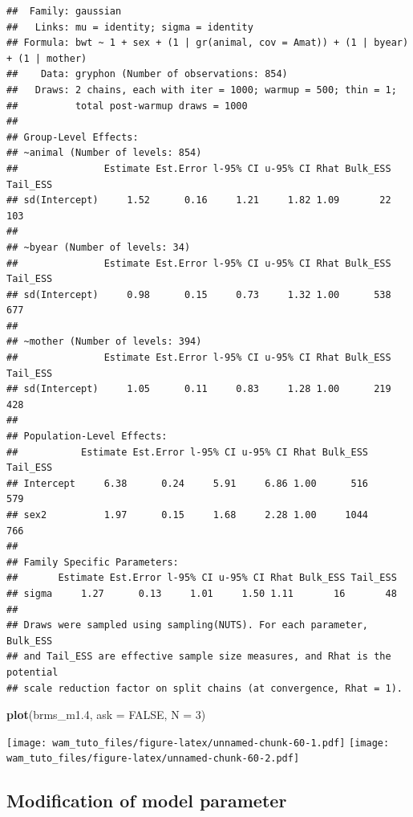 \documentclass[
  12pt,
]{book}
\newenvironment{Shaded}{\begin{snugshade}}{\end{snugshade}}
\newcommand{\DataTypeTok}[1]{\textcolor[rgb]{0.13,0.29,0.53}{#1}}
\newcommand{\DecValTok}[1]{\textcolor[rgb]{0.00,0.00,0.81}{#1}}
\newcommand{\FloatTok}[1]{\textcolor[rgb]{0.00,0.00,0.81}{#1}}
\newcommand{\KeywordTok}[1]{\textcolor[rgb]{0.13,0.29,0.53}{\textbf{#1}}}
\newcommand{\NormalTok}[1]{#1}
\newcommand{\OtherTok}[1]{\textcolor[rgb]{0.56,0.35,0.01}{#1}}
\begin{document}
\begin{verbatim}
##  Family: gaussian 
##   Links: mu = identity; sigma = identity 
## Formula: bwt ~ 1 + sex + (1 | gr(animal, cov = Amat)) + (1 | byear) + (1 | mother) 
##    Data: gryphon (Number of observations: 854) 
##   Draws: 2 chains, each with iter = 1000; warmup = 500; thin = 1;
##          total post-warmup draws = 1000
## 
## Group-Level Effects: 
## ~animal (Number of levels: 854) 
##               Estimate Est.Error l-95% CI u-95% CI Rhat Bulk_ESS Tail_ESS
## sd(Intercept)     1.52      0.16     1.21     1.82 1.09       22      103
## 
## ~byear (Number of levels: 34) 
##               Estimate Est.Error l-95% CI u-95% CI Rhat Bulk_ESS Tail_ESS
## sd(Intercept)     0.98      0.15     0.73     1.32 1.00      538      677
## 
## ~mother (Number of levels: 394) 
##               Estimate Est.Error l-95% CI u-95% CI Rhat Bulk_ESS Tail_ESS
## sd(Intercept)     1.05      0.11     0.83     1.28 1.00      219      428
## 
## Population-Level Effects: 
##           Estimate Est.Error l-95% CI u-95% CI Rhat Bulk_ESS Tail_ESS
## Intercept     6.38      0.24     5.91     6.86 1.00      516      579
## sex2          1.97      0.15     1.68     2.28 1.00     1044      766
## 
## Family Specific Parameters: 
##       Estimate Est.Error l-95% CI u-95% CI Rhat Bulk_ESS Tail_ESS
## sigma     1.27      0.13     1.01     1.50 1.11       16       48
## 
## Draws were sampled using sampling(NUTS). For each parameter, Bulk_ESS
## and Tail_ESS are effective sample size measures, and Rhat is the potential
## scale reduction factor on split chains (at convergence, Rhat = 1).
\end{verbatim}

\begin{Shaded}
\begin{Highlighting}[]
\KeywordTok{plot}\NormalTok{(brms\_m1}\FloatTok{.4}\NormalTok{, }\DataTypeTok{ask =} \OtherTok{FALSE}\NormalTok{, }\DataTypeTok{N =} \DecValTok{3}\NormalTok{)}
\end{Highlighting}
\end{Shaded}

\texttt{[image: wam\_tuto\_files/figure-latex/unnamed-chunk-60-1.pdf]} \texttt{[image: wam\_tuto\_files/figure-latex/unnamed-chunk-60-2.pdf]}

\hypertarget{modification-of-model-parameter-2}{%
\subsection{Modification of model parameter}\label{modification-of-model-parameter-2}}
\end{document}
